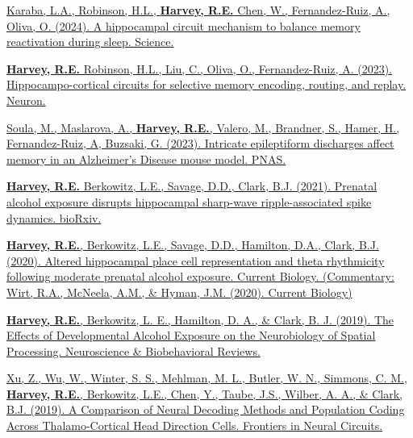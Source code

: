 \begin{cventries}
\cventry
    {} %
    {} %
    {} %
    {} %
    {
      \begin{cvitems} %
      \setlength\itemsep{0.5em}
            \item {\href{https://doi.org/10.1126/science.ado5708}{Karaba, L.A., Robinson, H.L., \textbf{Harvey, R.E.}  Chen, W., Fernandez-Ruiz, A., Oliva, O.  (2024). A hippocampal circuit mechanism to balance memory reactivation during sleep. Science.}}
            \item {\href{https://doi.org/10.1016/j.neuron.2023.04.015}{\textbf{Harvey, R.E.} Robinson, H.L., Liu, C., Oliva, O., Fernandez-Ruiz, A. (2023). Hippocampo-cortical circuits for selective memory encoding, routing, and replay. Neuron.}}
            \item {\href{https://doi.org/10.1073/pnas.2302676120 }{Soula, M., Maslarova, A., \textbf{Harvey, R.E.}, Valero, M., Brandner, S., Hamer, H., Fernandez-Ruiz, A, Buzsaki, G. (2023). Intricate epileptiform discharges affect memory in an Alzheimer's Disease mouse model. PNAS.}}
            \item {\href{https://doi.org/10.1101/2021.06.29.450435}{\textbf{Harvey, R.E.} Berkowitz, L.E., Savage, D.D., Clark, B.J. (2021). Prenatal alcohol exposure disrupts hippocampal sharp-wave ripple-associated spike dynamics. bioRxiv.}}
            \item {\href{https://doi.org/10.1016/j.cub.2020.06.077}{\textbf{Harvey, R.E.}, Berkowitz, L.E., Savage, D.D., Hamilton, D.A., Clark, B.J. (2020). Altered hippocampal place cell representation and theta rhythmicity following moderate prenatal alcohol exposure. Current Biology.}\href{https://doi.org/10.1016/j.cub.2020.07.020}{{ (\scriptsize Commentary: Wirt, R.A., McNeela, A.M., \& Hyman, J.M. (2020). Current Biology})}}
            \item {\href{https://doi.org/10.1016/j.neubiorev.2019.09.018}{\textbf{Harvey, R.E.}, Berkowitz, L. E., Hamilton, D. A., \& Clark, B. J. (2019). The Effects of Developmental Alcohol Exposure on the Neurobiology of Spatial Processing. Neuroscience \& Biobehavioral Reviews.}}
            \item {\href{https://doi.org/10.3389/fncir.2019.00075}{Xu, Z., Wu, W., Winter, S. S., Mehlman, M. L., Butler, W. N., Simmons, C. M., \textbf{Harvey, R.E.}, Berkowitz, L.E., Chen, Y., Taube, J.S., Wilber, A. A., \& Clark, B.J. (2019). A Comparison of Neural Decoding Methods and Population Coding Across Thalamo-Cortical Head Direction Cells. Frontiers in Neural Circuits.}}

\end{cvitems}}
\end{cventries}
